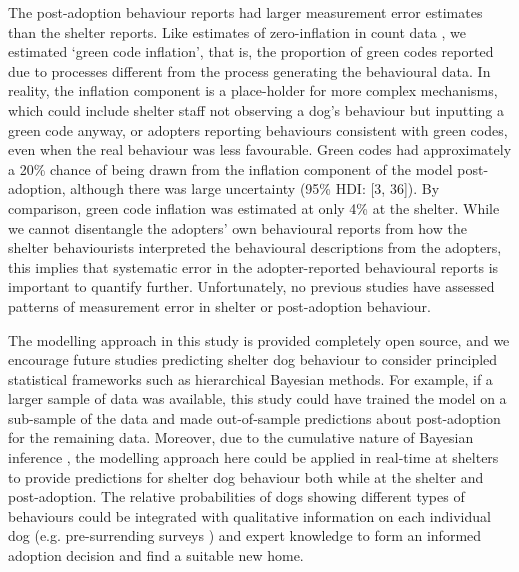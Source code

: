 \documentclass[fleqn,10pt]{wlscirep}
\begin{document}
The post-adoption behaviour reports had larger measurement error estimates than the shelter reports. Like estimates of zero-inflation in count data \cite{lambert1992}, we estimated `green code inflation', that is, the proportion of green codes reported due to processes different from the process generating the behavioural data. In reality, the inflation component is a place-holder for more complex mechanisms, which could include shelter staff not observing a dog's behaviour but inputting a green code anyway, or adopters reporting behaviours consistent with green codes, even when the real behaviour was less favourable. Green codes had approximately a 20\% chance of being drawn from the inflation component of the model post-adoption, although there was large uncertainty (95\% HDI: [3, 36]). By comparison, green code inflation was estimated at only 4\% at the shelter. While we cannot disentangle the adopters' own behavioural reports from how the shelter behaviourists interpreted the behavioural descriptions from the adopters, this implies that systematic error in the adopter-reported behavioural reports is important to quantify further. Unfortunately, no previous studies have assessed patterns of measurement error in shelter or post-adoption behaviour.

The modelling approach in this study is provided completely open source, and we encourage future studies predicting shelter dog behaviour to consider principled statistical frameworks such as hierarchical Bayesian methods. For example, if a larger sample of data was available, this study could have trained the model on a sub-sample of the data and made out-of-sample predictions about post-adoption for the remaining data. Moreover, due to the cumulative nature of Bayesian inference \cite{mcelreath2020}, the modelling approach here could be applied in real-time at shelters to provide predictions for shelter dog behaviour both while at the shelter and post-adoption. The relative probabilities of dogs showing different types of behaviours could be integrated with qualitative information on each individual dog (e.g. pre-surrending surveys \cite{ASPCA2018}) and expert knowledge to form an informed adoption decision and find a suitable new home.
\end{document}
